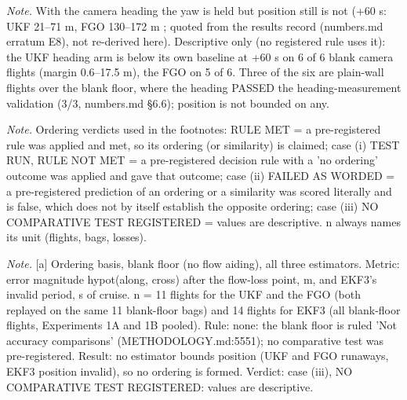 \begin{table}[htbp]
\textit{Note.} With the camera heading the yaw is held but position still is not (+60 s: UKF 21--71 m, FGO 130--172 m \textdagger{}; quoted from the results record (numbers.md erratum E8), not re-derived here). Descriptive only (no registered rule uses it): the UKF heading arm is below its own baseline at +60 s on 6 of 6 blank camera flights (margin 0.6--17.5 m), the FGO on 5 of 6. Three of the six are plain-wall flights over the blank floor, where the heading PASSED the heading-measurement validation (3/3, numbers.md \S{}6.6); position is not bounded on any.\par
\textit{Note.} Ordering verdicts used in the footnotes: RULE MET = a pre-registered rule was applied and met, so its ordering (or similarity) is claimed; case (i) TEST RUN, RULE NOT MET = a pre-registered decision rule with a 'no ordering' outcome was applied and gave that outcome; case (ii) FAILED AS WORDED = a pre-registered prediction of an ordering or a similarity was scored literally and is false, which does not by itself establish the opposite ordering; case (iii) NO COMPARATIVE TEST REGISTERED = values are descriptive. n always names its unit (flights, bags, losses).\par
\textit{Note.} [a] Ordering basis, blank floor (no flow aiding), all three estimators. Metric: error magnitude hypot(along, cross) after the flow-loss point, m, and EKF3's invalid period, s of cruise. n = 11 flights for the UKF and the FGO (both replayed on the same 11 blank-floor bags) and 14 flights for EKF3 (all blank-floor flights, Experiments 1A and 1B pooled). Rule: none: the blank floor is ruled 'Not accuracy comparisons' (METHODOLOGY.md:5551); no comparative test was pre-registered. Result: no estimator bounds position (UKF and FGO runaways, EKF3 position invalid), so no ordering is formed. Verdict: case (iii), NO COMPARATIVE TEST REGISTERED: values are descriptive.\par
\end{table}
